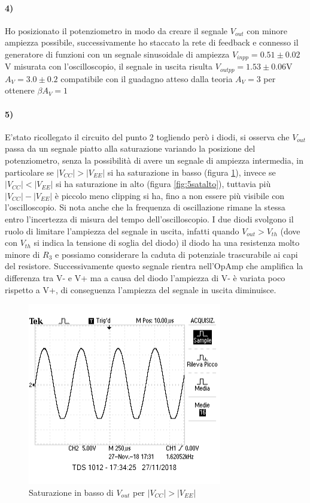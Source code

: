 \documentclass{article}
\begin{document}
\paragraph{4)}
Ho posizionato il potenziometro in modo da creare il segnale $V_{out}$ con minore ampiezza possibile, successivamente ho staccato la rete di feedback e connesso il generatore di funzioni con un segnale sinusoidale di ampiezza $V_{inpp}=0.51\pm0.02$V misurata con l'oscilloscopio, il segnale in uscita risulta $V_{outpp}=1.53\pm0.06$V $A_V=3.0\pm0.2$ compatibile con il guadagno atteso dalla teoria $A_V=3$ per ottenere $\beta A_V=1$

\paragraph{5)}
E'stato ricollegato il circuito del punto 2 togliendo però i diodi, si osserva che $V_{out}$ passa da un segnale piatto alla saturazione variando la posizione del potenziometro, senza la possibilità di avere un segnale di ampiezza intermedia, in particolare se $|V_{CC}|>|V_{EE}|$ si ha saturazione in basso (figura \ref{fig:5satbasso}), invece se $|V_{CC}|<|V_{EE}|$ si ha saturazione in alto (figura \ref{fig:5satalto}), tuttavia più $|V_{CC}|-|V_{EE}|$ è piccolo meno clipping si ha, fino a non essere più visibile con l'oscilloscopio. Si nota anche che la frequenza di oscillazione rimane la stessa entro l'incertezza di misura del tempo dell'oscilloscopio.\newline
 I due diodi svolgono il ruolo di limitare l'ampiezza del segnale in uscita, infatti quando $V_{out}>V_{th}$ (dove con $V_{th}$ si indica la tensione di soglia del diodo) il diodo ha una resistenza molto minore di $R_3$ e possiamo considerare la caduta di potenziale trascurabile ai capi del resistore. Successivamente questo segnale rientra nell'OpAmp che amplifica la differenza tra V- e V+ ma a causa del diodo l'ampiezza di V- è variata poco rispetto a V+, di conseguenza l'ampiezza del segnale in uscita diminuisce.


\begin{figure}
	\centering
	\includegraphics[width=0.6\linewidth]{figure/5satBasso}
	\caption{Saturazione in basso di $V_{out}$ per $|V_{CC}|>|V_{EE}|$}
	\label{fig:5satbasso}
\end{figure}
\end{document}
